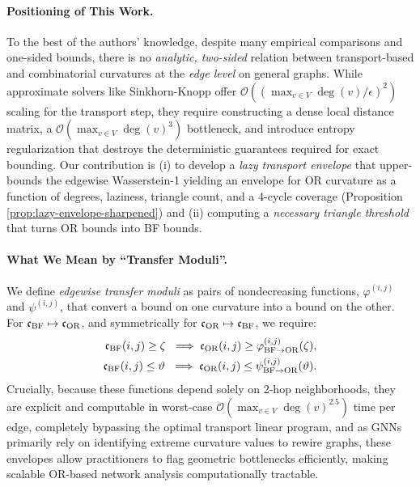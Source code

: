 \documentclass[twoside,11pt]{article}
\numberwithin{equation}{section}
\numberwithin{theorem}{section}
\numberwithin{example}{section}
\begin{document}
\paragraph{Positioning of This Work.}
To the best of the authors' knowledge, despite many empirical comparisons and one-sided bounds, there is no \emph{analytic, two-sided} relation between transport-based and combinatorial curvatures at the \emph{edge level} on general graphs.
While approximate solvers like Sinkhorn-Knopp \citep[e.g.,][]{knight_sinkhorn_2008} offer 
$\mathcal{O}\left((\max_{v\in V}\deg(v)/ \epsilon)^2\right)$ scaling for the transport step, they require constructing a dense local distance matrix, a $\mathcal{O}(\max_{v\in V}\deg(v)^3)$ bottleneck, and introduce entropy regularization that destroys the deterministic guarantees required for exact bounding.
Our contribution is (i) to develop a \emph{lazy transport envelope} that upper-bounds the edgewise Wasserstein-1 yielding an envelope for OR curvature as a function of degrees, laziness, triangle count, and a 4-cycle coverage (Proposition \ref{prop:lazy-envelope-sharpened}) and (ii) computing a \emph{necessary triangle threshold} that turns OR bounds into BF bounds.

\paragraph{What We Mean by ``Transfer Moduli''.}
We define \emph{edgewise transfer moduli} as pairs of nondecreasing functions, \(\varphi^{(i,j)}\) and \(\psi^{(i,j)}\), that convert a bound on one curvature into a bound on the other. 
For $\mathfrak c_{\rm BF} \mapsto \mathfrak c_{\rm OR}$, and symmetrically for $\mathfrak c_{\rm OR} \mapsto \mathfrak c_{\rm BF}$, we require:
\[
\begin{aligned}
 \mathfrak c_{\rm BF}(i,j)\ge \zeta \ \implies\mathfrak c_{\rm OR}(i,j)\ge \varphi^{(i,j)}_{\rm BF \to OR}(\zeta),\\
 \mathfrak c_{\rm BF}(i,j)\le \vartheta \ \implies \mathfrak c_{\rm OR}(i,j)\le \psi^{(i,j)}_{\rm BF \to OR}(\vartheta).
\end{aligned}
\]
Crucially, because these functions depend solely on 2-hop neighborhoods, they are explicit and computable in worst-case $\mathcal{O}(\max_{v\in V}\deg(v)^{2.5})$ time per edge, completely bypassing the optimal transport linear program, and as GNNs primarily rely on identifying extreme curvature values to rewire graphs, these envelopes allow practitioners to flag geometric bottlenecks efficiently, making scalable OR-based network analysis computationally tractable.
\end{document}
